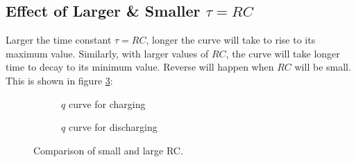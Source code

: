 \subsection*{Effect of Larger \& Smaller $\tau = RC$}
Larger the time constant $\tau = RC$, longer the curve will take to rise to its maximum
value. Similarly, with larger values of $RC$, the curve will take longer time
to decay to its minimum value. Reverse will happen when $RC$ will be small.
This is shown in figure \ref{fig:11.43}:
\begin{figure}[htbp]
  \centering
  \begin{subfigure}[t]{0.3\textwidth}
      \caption{$q$ curve for charging}
      \label{fig:11.43a}
  \end{subfigure}
  \begin{subfigure}[t]{0.3\textwidth}
      \caption{$q$ curve for discharging}
      \label{fig:11.43b}
  \end{subfigure}
  \captionsetup{justification = centering}
  \caption[]{Comparison of small and large RC.}
  \label{fig:11.43}
\end{figure}

